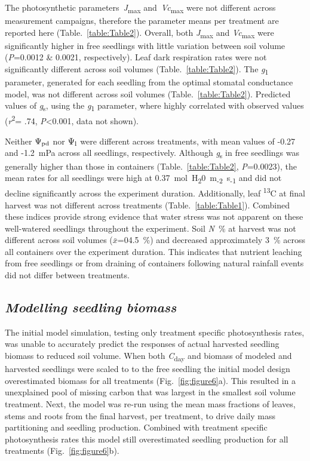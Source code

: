 \documentclass[a4paper]{article}\usepackage[]{graphicx}\usepackage[]{color}
\begin{document}
The photosynthetic parameters~\textit{J}\textsubscript{max} and~\textit{Vc}\textsubscript{max} were not different across measurement campaigns, therefore the parameter means per treatment are reported here (Table.~\ref{table:Table2}).  Overall, both \textit{J}\textsubscript{max} and \textit{Vc}\textsubscript{max} were significantly higher in free seedlings with little variation between soil volume (\textit{P}=0.0012 \& 0.0021, respectively). Leaf dark respiration rates were not significantly different across soil volumes (Table.~\ref{table:Table2}). The \textit{g}\textsubscript{1} parameter, generated for each seedling from the \citet{medlyn2012reconciling} optimal stomatal conductance model, was not different across soil volumes (Table.~\ref{table:Table2}). Predicted values of \textit{g}\textsubscript{s}, using the \textit{g}\textsubscript{1} parameter, where highly correlated with observed values (\textit{r}\textsuperscript{2}= .74, \textit{P}\textless0.001, data not shown).

Neither $\Psi\textsubscript{pd}$ nor $\Psi\textsubscript{l}$ were different across treatments, with mean values of -0.27 and -1.2~mPa across all seedlings, respectively. Although \textit{g}\textsubscript{s} in free seedlings was generally higher than those in containers (Table.~\ref{table:Table2}, \textit{P}=0.0023), the mean rates for all seedlings were high at 0.37~mol~H\textsubscript{2}0~m\textsubscript{-2}~s\textsubscript{-1} and did not decline significantly across the experiment duration. Additionally, leaf {\textdelta}\textsuperscript{13}C at final harvest was not different across treatments (Table.~\ref{table:Table1}). Combined these indices provide strong evidence that water stress was not apparent on these well-watered seedlings throughout the experiment. Soil \textit{N}~\% at harvest was not different across soil volumes ($\bar{x}$=04.5~\%) and decreased approximately 3~\% across all containers over the experiment duration. This indicates that nutrient leaching from free seedlings or from draining of containers following natural rainfall events did not differ between treatments. 

\subsection*{\textit{Modelling seedling biomass}}
The initial model simulation, testing only treatment specific photosynthesis rates, was unable to accurately predict the responses of actual harvested seedling biomass to reduced soil volume.  When both \textit{C}\textsubscript{day} and biomass of modeled and harvested seedlings were scaled to to the free seedling the initial model design overestimated biomass for all treatments (Fig.~\ref{fig:figure6}a).  This resulted in a unexplained pool of missing carbon that was largest in the smallest soil volume treatment. Next, the model was re-run using the mean mass fractions of leaves, stems and roots from the final harvest, per treatment, to drive daily mass partitioning and seedling production.  Combined with treatment specific photosynthesis rates this model still overestimated seedling production for all treatments (Fig.~\ref{fig:figure6}b).  
\end{document}
